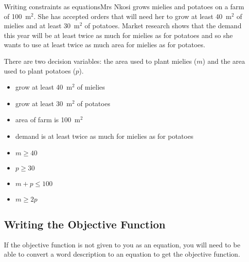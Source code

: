 \begin{wex}{Writing constraints as equations}{Mrs Nkosi grows mielies and potatoes on a farm of 100~m$^2$. She has accepted orders that will need her to grow at least 40~m$^2$ of mielies and at least 30~m$^2$ of potatoes. Market research shows that the demand this year will be at least twice as much for mielies as for potatoes and so she wants to use at least twice as much area for mielies as for potatoes.}
{
There are two decision variables: the area used to plant mielies ($m$) and the area used to plant potatoes ($p$).

\begin{itemize}
\item{grow at least 40~m$^2$ of mielies}
\item{grow at least 30~m$^2$ of potatoes}
\item{area of farm is 100~m$^2$}
\item{demand is at least twice as much for mielies as for potatoes}
\end{itemize}

\begin{itemize}
\item{$m \geq 40$}
\item{$p \geq 30$}
\item{$m+p \leq 100$}
\item{$m\geq 2p$}
\end{itemize}
}
\end{wex}


\subsection{Writing the Objective Function}
If the objective function is not given to you as an equation, you will need to be able to convert a word description to an equation to get the objective function. 

